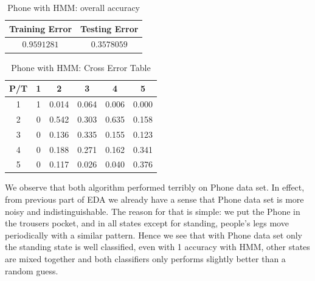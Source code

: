 \begin{itemize}
\begin{table}[!htb]
\begin{center}
\begin{tabular}{c|c}
      \hline
      Training Error & Testing Error\\
      \hline
      $0.9591281$ & $0.3578059$ \\
      \hline
\end{tabular}
\caption{Phone with HMM: overall accuracy}
\label{tab:phoneHMM1}
\end{center}
\end{table}
\begin{table}[!htb]
\begin{center}
\begin{tabular}{c|c|c|c|c|c}
      \hline
      P/T& 1 & 2 &3 & 4 & 5 \\
      \hline
      1 &1&0.014&0.064&0.006&0.000\\
      2 &0&0.542&0.303&0.635&0.158\\
      3 &0&0.136&0.335&0.155&0.123\\
      4 &0&0.188&0.271&0.162&0.341\\
      5 & 0&0.117&0.026&0.040&0.376\\
      \hline
\end{tabular}
\caption{Phone with HMM: Cross Error Table}
\label{tab:phoneHMM2}
\end{center}
\end{table}
\end{itemize}

We observe that both algorithm performed terribly on Phone data set. In effect, from previous part of EDA we already have a sense that Phone data set is more noisy and indistinguishable. The reason for that is simple: we put the Phone in the trousers pocket, and in all states except for standing, people's legs move periodically with a similar pattern. Hence we see that with Phone data set only the standing state is well classified, even with 1 accuracy with HMM, other states are mixed together and both classifiers only performs slightly better than a random guess. 


